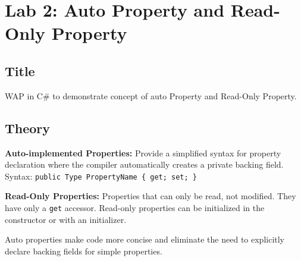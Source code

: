 \documentclass[10pt,a4paper]{article}
\begin{document}
\newpage

\section*{Lab 2: Auto Property and Read-Only Property}

\subsection*{Title}
WAP in C\# to demonstrate concept of auto Property and Read-Only Property.

\subsection*{Theory}
\textbf{Auto-implemented Properties:} Provide a simplified syntax for property declaration where the compiler automatically creates a private backing field. Syntax: \texttt{public Type PropertyName \{ get; set; \}}

\textbf{Read-Only Properties:} Properties that can only be read, not modified. They have only a \texttt{get} accessor. Read-only properties can be initialized in the constructor or with an initializer.

Auto properties make code more concise and eliminate the need to explicitly declare backing fields for simple properties.
\end{document}

